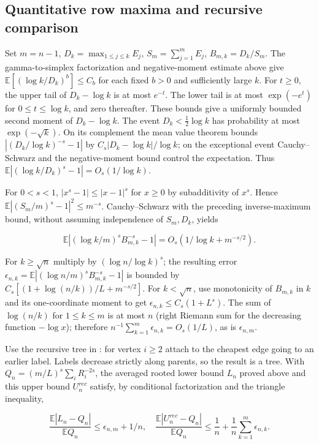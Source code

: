 \documentclass[11pt]{article}
\begin{document}
\subsection{Quantitative row maxima and recursive comparison}\label{quantitative-row-maxima-and-recursive-comparison}

Set \(m=n-1\), \(D_k=\max_{1\le j\le k}E_j\), \(S_m=\sum_{j=1}^m E_j\), \(B_{m,k}=D_k/S_m\). The gamma-to-simplex factorization and negative-moment estimate above give \(\mathbb E[(\log k/D_k)^b]\le C_b\) for each fixed \(b>0\) and sufficiently large \(k\). For \(t\ge0\), the upper tail of \(D_k-\log k\) is at most \(e^{-t}\). The lower tail is at most \(\exp(-e^t)\) for \(0\le t\le\log k\), and zero thereafter. These bounds give a uniformly bounded second moment of \(D_k-\log k\). The event \(D_k<\frac12\log k\) has probability at most \(\exp(-\sqrt k)\). On its complement the mean value theorem bounds \(|(D_k/\log k)^{-s}-1|\) by \(C_s|D_k-\log k|/\log k\); on the exceptional event Cauchy--Schwarz and the negative-moment bound control the expectation. Thus \(\mathbb E| (\log k/D_k)^s-1|=O_s(1/\log k)\).

For \(0<s<1\), \(|x^s-1|\le|x-1|^s\) for \(x\ge0\) by subadditivity of \(x^s\). Hence \(\mathbb E|(S_m/m)^s-1|^2\le m^{-s}\). Cauchy--Schwarz with the preceding inverse-maximum bound, without assuming independence of \(S_m,D_k\), yields

\[\mathbb E| (\log k/m)^s B_{m,k}^{-s}-1|=O_s(1/\log k +m^{-s/2}).\]

For \(k\ge\sqrt n\) multiply by \((\log n/\log k)^s\); the resulting error \(\epsilon_{n,k}=\mathbb E|(\log n/m)^s B_{m,k}^{-s}-1|\) is bounded by \(C_s[(1+\log(n/k))/L+m^{-s/2}]\). For \(k<\sqrt n\), use monotonicity of \(B_{m,k}\) in \(k\) and its one-coordinate moment to get \(\epsilon_{n,k}\le C_s(1+L^s)\). The sum of \(\log(n/k)\) for \(1\le k\le m\) is at most \(n\) (right Riemann sum for the decreasing function \(-\log x\)); therefore \(n^{-1}\sum_{k=1}^m\epsilon_{n,k}=O_s(1/L)\), as is \(\epsilon_{n,m}\).

Use the recursive tree in \cite{Vecer}: for vertex \(i\ge2\) attach to the cheapest edge going to an earlier label. Labels decrease strictly along parents, so the result is a tree. With \(Q_n=(m/L)^s\sum_iR_i^{-2s}\), the averaged rooted lower bound \(L_n\) proved above and this upper bound \(U_n^{rec}\) satisfy, by conditional factorization and the triangle inequality,

\[\frac{\mathbb E|L_n-Q_n|}{\mathbb E Q_n}\le\epsilon_{n,m}+1/n,\quad \frac{\mathbb E|U_n^{rec}-Q_n|}{\mathbb E Q_n}\le\frac1n+\frac1n\sum_{k=1}^m\epsilon_{n,k}.\]
\end{document}
